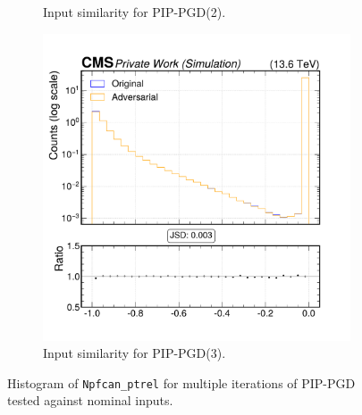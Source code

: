 \begin{figure}[htbp]
\begin{subfigure}[t]{0.32\textwidth}
    \caption*{Input similarity for PIP-PGD(2).}
  \end{subfigure}\hfill
  \begin{subfigure}[t]{0.32\textwidth}
    \includegraphics[width=\linewidth]{media/output/features/compare/combined_it_3/cmp_npf_arr_Npfcan_ptrel.pdf}
    \caption*{Input similarity for PIP-PGD(3).}
  \end{subfigure}

  \caption*{Histogram of \texttt{Npfcan\_ptrel} for multiple iterations of PIP-PGD tested against nominal inputs.}
  \label{fig:combined_input_Npfcan_ptrel}
\end{figure}

